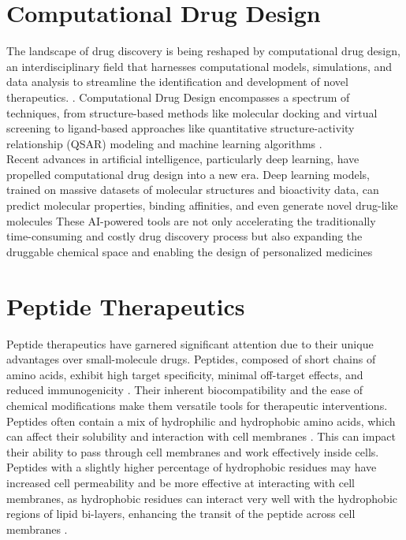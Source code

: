 \section{Computational Drug Design} 
\label{sec:ComputationalDrugDesign} 
The landscape of drug discovery is being reshaped by computational drug design, an interdisciplinary
field that harnesses computational models, simulations, and data analysis to streamline the
identification and development of novel therapeutics. \cite{schneider2020rethinking}. Computational
Drug Design encompasses a spectrum of techniques, from structure-based methods like molecular
docking \cite{kitchen2004docking} and virtual screening \cite{shoichet2004virtual} to ligand-based
approaches like quantitative structure-activity relationship (QSAR) modeling
\cite{cherkasov2014qsar} and machine learning algorithms \cite{gawehn2016dl}. \\

Recent advances in artificial intelligence, particularly deep learning, have propelled computational
drug design into a new era. Deep learning models, trained on massive datasets of molecular
structures and bioactivity data, can predict molecular properties, binding affinities, and even
generate novel drug-like molecules \cite{zeng2022deep} These AI-powered tools are not only
accelerating the traditionally time-consuming and costly drug discovery process but also expanding
the druggable chemical space and enabling the design of personalized medicines \cite{gawehn2016dl}


\section{Peptide Therapeutics} 
\label{sec:PeptideTherapeutics} 
Peptide therapeutics have garnered significant attention due to their unique advantages over
small-molecule drugs. Peptides, composed of short chains of amino acids, exhibit high target
specificity, minimal off-target effects, and reduced immunogenicity \cite{wang2022therapeutic}.
Their inherent biocompatibility and the ease of chemical modifications make them versatile tools for
therapeutic interventions. Peptides often contain a mix of hydrophilic and hydrophobic amino acids,
which can affect their solubility and interaction with cell membranes \cite{madani2011mech}. This
can impact their ability to pass through cell membranes and work effectively inside cells. Peptides
with a slightly higher percentage of hydrophobic residues may have increased cell permeability
\cite{madani2011mech} and be more effective at interacting with cell membranes, as hydrophobic
residues can interact very well with the hydrophobic regions of lipid bi-layers, enhancing the
transit of the peptide across cell membranes \cite{madani2011mech}. \\

